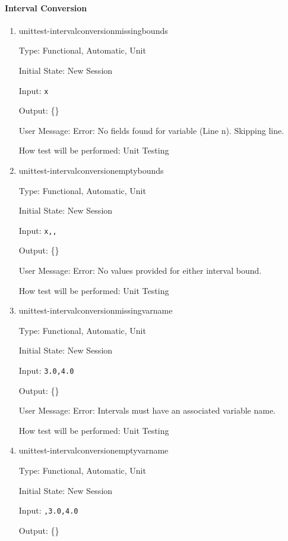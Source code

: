 \documentclass[12pt, titlepage]{article}
\begin{document}
\paragraph{Interval Conversion}
\begin{enumerate}
	
	\item{unittest-intervalconversionmissingbounds}
	
	Type: Functional, Automatic, Unit
	
	Initial State: New Session
	
	Input: \texttt{x}
	
	Output: \{\}
	
	User Message: Error: No fields found for variable (Line n). Skipping line.
	
	How test will be performed: Unit Testing\\
	
	\item{unittest-intervalconversionemptybounds}
	
	Type: Functional, Automatic, Unit
	
	Initial State: New Session
	
	Input: \texttt{x,,}
	
	Output: \{\}
	
	User Message: Error: No values provided for either interval bound.
	
	How test will be performed: Unit Testing\\
	
	\item{unittest-intervalconversionmissingvarname}
	
	Type: Functional, Automatic, Unit
	
	Initial State: New Session
	
	Input: \texttt{3.0,4.0}
	
	Output: \{\}
	
	User Message: Error: Intervals must have an associated variable name.
	
	How test will be performed: Unit Testing\\
	
	\item{unittest-intervalconversionemptyvarname}
	
	Type: Functional, Automatic, Unit
	
	Initial State: New Session
	
	Input: \texttt{,3.0,4.0}
	
	Output: \{\}
	

\end{enumerate}
\end{document}
